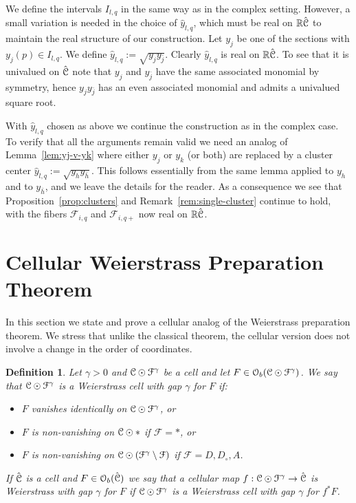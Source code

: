 \documentclass[reqno]{amsart}
\newtheorem{Def}[Cor]{Definition}{\bfseries}{\rmfamily}
\renewcommand\~[1]{\widetilde{#1}}
\def\cF{{\mathcal F}} \def\cL{{\mathcal L}} \def\cR{{\mathcal R}}
\def\cO{{\mathcal O}}
\begin{document}
We define the intervals $I_{l,q}$ in the same way as in the complex
setting. However, a small variation is needed in the choice of
$\hat y_{l,q}$, which must be real on ${\mathbb R}\hat{{\mathcal C}}$ to maintain the real
structure of our construction. Let $y_j$ be one of the sections with
$y_j(p)\in I_{l,q}$. We define
$\hat y_{l,q}:=\sqrt{y_jy_{\bar j}}$. Clearly $\hat y_{l,q}$ is real
on ${\mathbb R}\hat{{\mathcal C}}$. To see that it is univalued on $\hat{{\mathcal C}}$ note that
$y_j$ and $y_{\bar j}$ have the same associated monomial by symmetry,
hence $y_jy_{\bar j}$ has an even associated monomial and admits a
univalued square root.

With $\hat y_{l,q}$ chosen as above we continue the construction as in
the complex case. To verify that all the arguments remain valid we
need an analog of Lemma~\ref{lem:yj-v-yk} where either $y_j$ or $y_k$
(or both) are replaced by a cluster center
$\hat y_{l,q}:=\sqrt{y_hy_{\bar h}}$. This follows essentially from
the same lemma applied to $y_h$ and to $y_{\bar h}$, and we leave the
details for the reader. As a consequence we see that
Proposition~\ref{prop:clusters} and Remark~\ref{rem:single-cluster}
continue to hold, with the fibers $\cF_{i,q}$ and $\cF_{i,q+}$ now
real on ${\mathbb R}\hat{{\mathcal C}}$.


\section{Cellular Weierstrass Preparation Theorem}
\label{sec:weierstrass}

In this section we state and prove a cellular analog of the
Weierstrass preparation theorem. We stress that unlike the classical
theorem, the cellular version does not involve a change in the order
of coordinates. 

\begin{Def}
  Let $\gamma>0$ and $\cC\odot\cF^\gamma$ be a cell and let
  $F\in\cO_b(\cC\odot\cF^\gamma)$. We say that $\cC\odot\cF^\gamma$ is
  a \emph{Weierstrass cell} with \emph{gap} $\gamma$ for $F$ if:
  \begin{itemize}
  \item $F$ vanishes identically on $\cC\odot\cF^\gamma$, or
  \item $F$ is non-vanishing on ${\mathcal C}\odot*$ if $\cF=*$, or
  \item $F$ is non-vanishing on $\cC\odot(\cF^\gamma\setminus\cF)$ if
    $\cF=D,D_\circ,A$.
  \end{itemize}

  If $\hat{{\mathcal C}}$ is a cell and $F\in\cO_b(\hat\cC)$ we say that a
  cellular map $f:\cC\odot\cF^\gamma\to\hat\cC$ is Weierstrass with
  gap $\gamma$ for $F$ if $\cC\odot\cF^\gamma$ is a Weierstrass cell
  with gap $\gamma$ for $f^*F$.
\end{Def}
\end{document}

